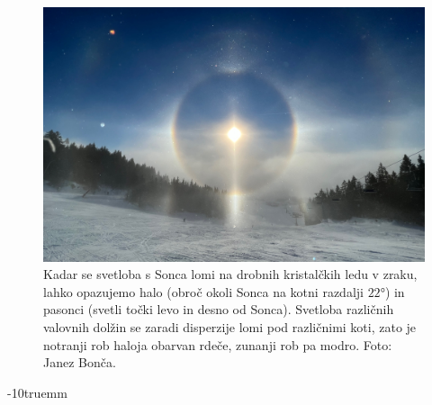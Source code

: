 \begin{figure}[!htp]
\centering
\includegraphics[width=93truemm]{slike/09_halo.jpg}
\caption{Kadar se svetloba s Sonca lomi na drobnih kristalčkih ledu v zraku, 
lahko opazujemo halo (obroč okoli Sonca na kotni razdalji $22\si{\degree}$) 
in pasonci (svetli točki levo in desno od Sonca). 
Svetloba različnih valovnih dolžin se zaradi disperzije lomi pod različnimi koti, zato je 
notranji rob haloja obarvan rdeče, zunanji rob pa modro. Foto: Janez Bonča.}
\label{fig:09_halo}
\end{figure}
\vglue-10truemm

